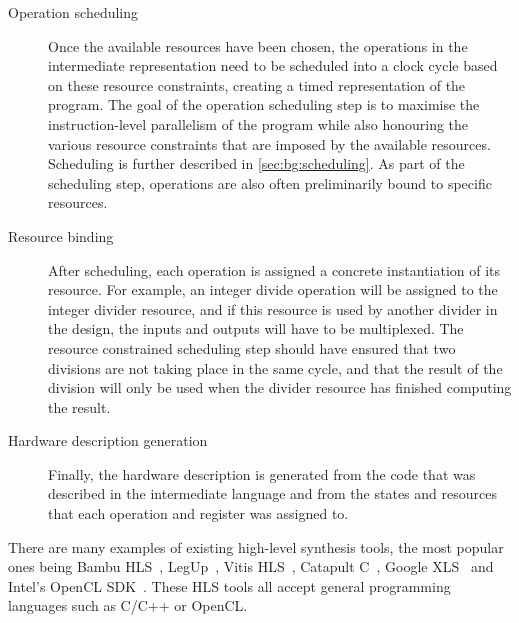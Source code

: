\begin{description}
\item[Operation scheduling] Once the available resources have been chosen, the
  operations in the intermediate representation need to be scheduled into a
  clock cycle based on these resource constraints, creating a timed
  representation of the program.  The goal of the operation scheduling step is
  to maximise the instruction-level parallelism of the program while also
  honouring the various resource constraints that are imposed by the available
  resources.  Scheduling is further described in \cref{sec:bg:scheduling}.  As
  part of the scheduling step, operations are also often preliminarily bound to
  specific resources.

\item[Resource binding] After scheduling, each operation is assigned a concrete
  instantiation of its resource.  For example, an integer divide operation will
  be assigned to the integer divider resource, and if this resource is used by
  another divider in the design, the inputs and outputs will have to be
  multiplexed.  The resource constrained scheduling step should have ensured
  that two divisions are not taking place in the same cycle, and that the result
  of the division will only be used when the divider resource has finished
  computing the result.

\item[Hardware description generation] Finally, the hardware description is
  generated from the code that was described in the intermediate language and
  from the states and resources that each operation and register was assigned
  to.
\end{description}

There are many examples of existing high-level synthesis tools, the most popular
ones being Bambu HLS~\cite{pilato13_bambu}, LegUp~\cite{canis13_l}, Vitis
HLS~\cite{amd23_vitis_high_synth}, Catapult
C~\cite{mentor20_catap_high_level_synth}, Google XLS~\cite{google23_xls} and
Intel's OpenCL SDK~\cite{intel20_sdk_openc_applic}.  These HLS tools all accept
general programming languages such as C/C++ or OpenCL.

